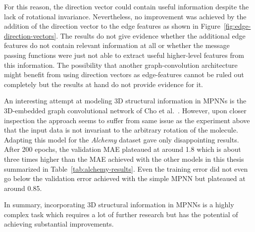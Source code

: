 For this reason, the direction vector could contain useful information despite the lack of rotational invariance. Nevertheless, no improvement was achieved by the addition of the direction vector to the edge features as shown in Figure~\ref{fig:edge-direction-vectors}. The results do not give evidence whether the additional edge features do not contain relevant information at all or whether the message passing functions were just not able to extract useful higher-level features from this information. The possibility that another graph-convolution architecture might benefit from using direction vectors as edge-features cannot be ruled out completely but the results at hand do not provide evidence for it.

An interesting attempt at modeling 3D structural information in MPNNs is the 3D-embedded graph convolutional network of Cho et al.~\cite{Cho2018}. However, upon closer inspection the approach seems to suffer from same issue as the experiment above that the input data is not invariant to the arbitrary rotation of the molecule. Adapting this model for the \textit{Alchemy} dataset gave only disappointing results. After 200 epochs, the validation MAE plateaued at around 1.8 which is about three times higher than the MAE achieved with the other models in this thesis summarized in Table~\ref{tab:alchemy-results}. Even the training error did not even go below the validation error achieved with the simple MPNN but plateaued at around 0.85.

In summary, incorporating 3D structural information in MPNNs is a highly complex task which requires a lot of further research but has the potential of achieving substantial improvements.






